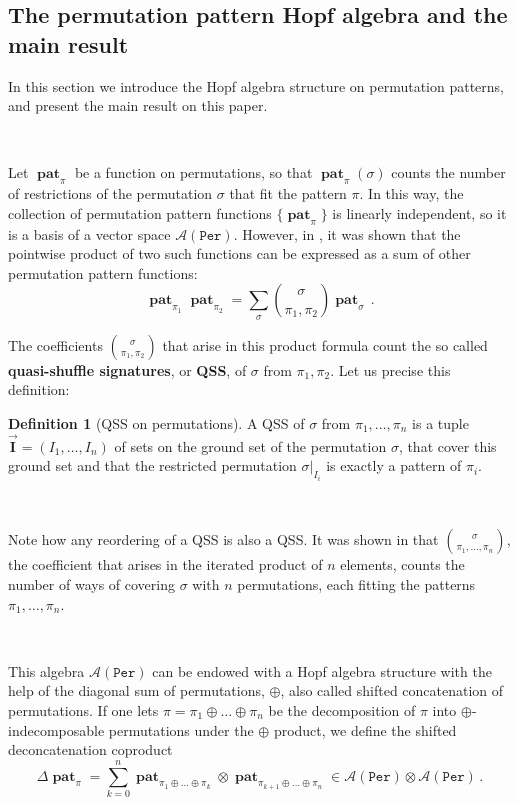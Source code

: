 \documentclass[12pt, reqno]{amsart}
\theoremstyle{definition}
\newtheorem{defin}[thm]{Definition}
\newcommand{\III}{\vec{\mathbf{I}}}
\DeclareMathOperator{\pat}{\mathbf{pat}}
\begin{document}
\subsection{The permutation pattern Hopf algebra and the main result}

In this section we introduce the Hopf algebra structure on permutation patterns, and present the main result on this paper.

\

Let $\pat_{\pi}$ be a function on permutations, so that $\pat_{\pi}(\sigma)$ counts the number of restrictions of the permutation $\sigma$ that fit the pattern $\pi$.
In this way, the collection of permutation pattern functions $\{\pat_{\pi}\}$ is linearly independent, so it is a basis of a vector space $\mathcal A (\mathtt{Per})$.
However, in \cite{Vargas}, it was shown that the pointwise product of two such functions can be expressed as a sum of other permutation pattern functions:
\begin{equation}\label{eq:prodperm}
\pat_{\pi_1} \pat_{\pi_2} = \sum_{\sigma} \binom{\sigma}{\pi_1, \pi_2} \pat_{\sigma} \, .
\end{equation}

The coefficients $\binom{\sigma}{\pi_1, \pi_2}$ that arise in this product formula count the so called \textbf{quasi-shuffle signatures}, or \textbf{QSS}, of $\sigma$ from $\pi_1, \pi_2$.
Let us precise this definition:

\begin{defin}[QSS on permutations]
A QSS of $\sigma$ from $\pi_1, \dots, \pi_n$ is a tuple $\III = (I_1, \dots, I_n)$ of sets on the ground set of the permutation $\sigma$, that cover this ground set and that the restricted permutation $\sigma|_{I_i}$ is exactly a pattern of $\pi_i$.

\

Note how any reordering of a QSS is also a QSS.
It was shown in \cite{Penaguiao2020} that $\binom{\sigma}{\pi_1, \dots, \pi_n}$, the coefficient that arises in the iterated product of $n$ elements, counts the number of ways of covering $\sigma$ with $n$ permutations, each fitting the patterns $\pi_1, \dots, \pi_n$.
\end{defin}

\

This algebra $\mathcal A(\mathtt{Per})$ can be endowed with a Hopf algebra structure with the help of the diagonal sum of permutations, $\oplus$, also called shifted concatenation of permutations.
If one lets $\pi = \pi_1 \oplus \dots \oplus \pi_n$ be the decomposition of $\pi$ into $\oplus$-indecomposable permutations under the $\oplus$ product, we define the shifted deconcatenation coproduct
$$\Delta \pat_{\pi} = \sum_{k=0}^n \pat_{\pi_1\oplus \dots \oplus \pi_k} \otimes \pat_{\pi_{k+1}\oplus \dots \oplus \pi_n} \in \mathcal A (\mathtt{Per}) \otimes \mathcal A (\mathtt{Per})\, .$$
\end{document}
